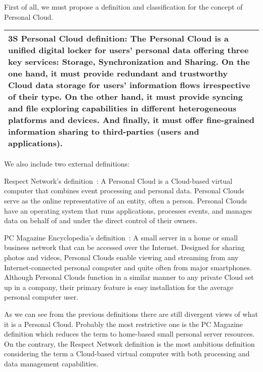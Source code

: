 First of all, we must propose a definition and classification for the concept of Personal Cloud.



{

\noindent\noindent\begin{tabularx}{\textwidth}{|m{}|}
\hline %
 \rowcolor[gray]{.8}
\textbf{3S Personal Cloud definition:} The Personal Cloud is a unified digital  locker for users' personal data offering three key services: Storage, Synchronization and Sharing.  On the one hand, it must provide redundant and trustworthy Cloud data storage for users' information flows irrespective of their type. On the other hand, it must provide syncing and file exploring capabilities in different heterogeneous platforms and devices. And finally, it must offer fine-grained information sharing to third-parties (users and applications).\\ \hline
\end{tabularx}


\bigskip
We also include two external definitions:

Respect Network's definition~\cite{respectnetwork}: A Personal Cloud is a Cloud-based virtual computer that combines event processing and personal data. Personal Clouds serve as the online representative of an entity, often a person. Personal Clouds have an operating system that runs applications, processes events, and manages data on behalf of and under the direct control of their owners. 


PC Magazine Encyclopedia's definition~\cite{pcmag}: A small server in a home or small business network that can be accessed over the Internet. Designed for sharing photos and videos, Personal Clouds enable viewing and streaming from any Internet-connected personal computer and quite often from major smartphones. Although Personal Clouds function in a similar manner to any private Cloud set up in a company, their primary feature is easy installation for the average personal computer user.

As we can see from the previous definitions there are still divergent views of what it is a Personal Cloud. Probably the most restrictive one is the PC Magazine definition which reduces the term to home-based small personal server resources.  On the contrary, the Respect Network definition is the most ambitious definition considering the term a Cloud-based virtual computer with both processing and data management capabilities. 

}
